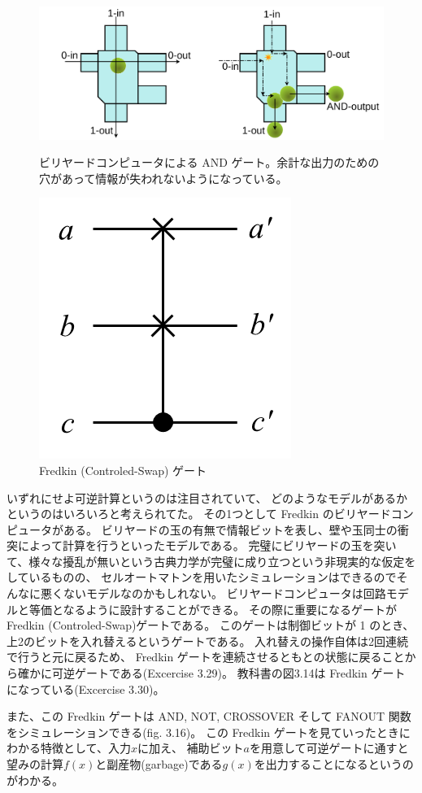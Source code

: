 \documentclass[../../master.tex]{subfiles}
\begin{document}
\clearpage
\begin{figure}
    \centering
    \includegraphics[width=0.4\columnwidth]{Toffoli_BilliardBall.png}
    \caption{ビリヤードコンピュータによる AND ゲート。余計な出力のための穴があって情報が失われないようになっている。}
    \includegraphics[width=0.3\columnwidth]{C-Swap.png}
    \caption{Fredkin (Controled-Swap) ゲート}
\end{figure}
いずれにせよ可逆計算というのは注目されていて、
どのようなモデルがあるかというのはいろいろと考えられてた。
その1つとして Fredkin のビリヤードコンピュータがある。
ビリヤードの玉の有無で情報ビットを表し、壁や玉同士の衝突によって計算を行うといったモデルである。
完璧にビリヤードの玉を突いて、様々な擾乱が無いという古典力学が完璧に成り立つという非現実的な仮定をしているものの、
セルオートマトンを用いたシミュレーションはできるのでそんなに悪くないモデルなのかもしれない。
ビリヤードコンピュータは回路モデルと等価となるように設計することができる。
その際に重要になるゲートが Fredkin (Controled-Swap)ゲートである。
このゲートは制御ビットが 1 のとき、上2のビットを入れ替えるというゲートである。
入れ替えの操作自体は2回連続で行うと元に戻るため、
Fredkin ゲートを連続させるともとの状態に戻ることから確かに可逆ゲートである(Excercise 3.29)。
教科書の図3.14は Fredkin ゲートになっている(Excercise 3.30)。

また、この Fredkin ゲートは AND, NOT, CROSSOVER そして FANOUT 関数をシミュレーションできる(fig. 3.16)。
この Fredkin ゲートを見ていったときにわかる特徴として、入力\(x\)に加え、
補助ビット\(a\)を用意して可逆ゲートに通すと望みの計算\(f(x)\)と副産物(garbage)である\(g(x)\)を出力することになるというのがわかる。
\end{document}
